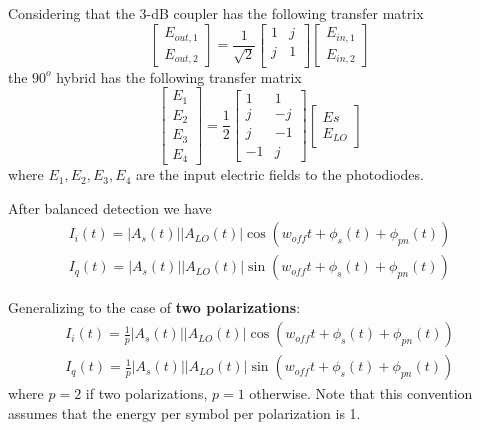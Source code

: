 \documentclass[a4paper]{article}
\begin{document}
Considering that the 3-dB coupler has the following transfer matrix
\begin{equation}
\begin{bmatrix}
E_{out, 1} \\
E_{out, 2}
\end{bmatrix} = \frac{1}{\sqrt{2}}\begin{bmatrix}
1 & j \\
j & 1 \\
\end{bmatrix}\begin{bmatrix}
E_{in, 1} \\
E_{in, 2}
\end{bmatrix}
\end{equation}
the $90^o$ hybrid has the following transfer matrix
\begin{equation}
\begin{bmatrix}
E_1\\
E_2\\
E_3\\
E_4
\end{bmatrix} = \frac{1}{2}\begin{bmatrix}
1 & 1 \\
j & -j \\
j & -1\\
-1 & j
\end{bmatrix}\begin{bmatrix}
E{s} \\
E_{LO}
\end{bmatrix}
\end{equation}
where $E_1, E_2, E_3, E_4$ are the input electric fields to the photodiodes.

After balanced detection we have
\begin{align}
I_i(t) = |A_s(t)||A_{LO}(t)|\cos(w_{off}t + \phi_s(t) + \phi_{pn}(t)) \\
I_q(t) = |A_s(t)||A_{LO}(t)|\sin(w_{off}t + \phi_s(t) + \phi_{pn}(t))
\end{align}

Generalizing to the case of \textbf{two polarizations}:
\begin{align}
I_i(t) = \frac{1}{p}|A_s(t)||A_{LO}(t)|\cos(w_{off}t + \phi_s(t) + \phi_{pn}(t)) \\
I_q(t) = \frac{1}{p}|A_s(t)||A_{LO}(t)|\sin(w_{off}t + \phi_s(t) + \phi_{pn}(t))
\end{align}
where $p = 2$ if two polarizations, $p = 1$ otherwise. Note that this convention assumes that the energy per symbol per polarization is 1.  
\end{document}
